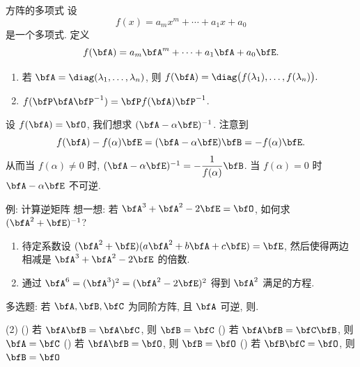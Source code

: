 \begin{frame}{方阵的多项式}
	\onslide<+->
	设
	\[f(x)=a_mx^m+\cdots+a_1x+a_0\]
	是一个多项式.
	\onslide<+->
	定义
	\[f(\bfA)=a_m\bfA^m+\cdots+a_1\bfA+a_0\bfE.\]
	\vspace{-\baselineskip}
	\begin{enumerate}
		\item 若 $\bfA=\diag(\lambda_1,\dots,\lambda_n)$, 则 $f(\bfA)=\diag\bigl(f(\lambda_1),\dots,f(\lambda_n)\bigr).$
		\item $f(\bfP\bfA\bfP^{-1})=\bfP f(\bfA)\bfP^{-1}$.
	\end{enumerate}

	\onslide<+->
	设 $f(\bfA)=\bfO$, 我们想求 $(\bfA-\alpha\bfE)^{-1}$.
	\onslide<+->
	注意到
	\[f(\bfA)-f(\alpha)\bfE=(\bfA-\alpha\bfE)\bfB=-f(\alpha)\bfE.\]
	\onslide<+->
	从而当 $f(\alpha)\neq 0$ 时, $(\bfA-\alpha\bfE)^{-1}=-\dfrac1{f(\alpha)}\bfB$.
	当 $f(\alpha)=0$ 时 $\bfA-\alpha\bfE$ 不可逆.
\end{frame}


\begin{frame}{例: 计算逆矩阵}
	\onslide<+->
	想一想: 若 $\bfA^3+\bfA^2-2\bfE=\bfO$, 如何求 $(\bfA^2+\bfE)^{-1}$?
	\begin{enumerate}
		\item 待定系数设 $(\bfA^2+\bfE)(a\bfA^2+b\bfA+c\bfE)=\bfE$, 然后使得两边相减是 $\bfA^3+\bfA^2-2\bfE$ 的倍数.
		\item 通过 $\bfA^6=(\bfA^3)^2=(\bfA^2-2\bfE)^2$ 得到 $\bfA^2$ 满足的方程.
	\end{enumerate}
	\onslide<+->
	\begin{example}
		多选题: 若 $\bfA,\bfB,\bfC$ 为同阶方阵, 且 $\bfA$ 可逆, 则.
		\begin{taskschoice}(2)
			() 若 $\bfA\bfB=\bfA\bfC$, 则 $\bfB=\bfC$
			() 若 $\bfA\bfB=\bfC\bfB$, 则 $\bfA=\bfC$
			() 若 $\bfA\bfB=\bfO$, 则 $\bfB=\bfO$
			() 若 $\bfB\bfC=\bfO$, 则 $\bfB=\bfO$
		\end{taskschoice}
	\end{example}
\end{frame}


